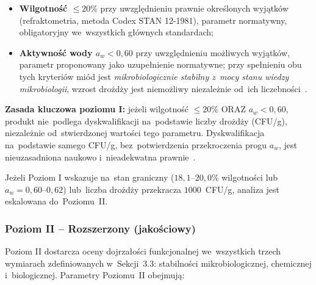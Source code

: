 \begin{itemize}
    \item \textbf{Wilgotność $\leq 20\%$} przy uwzględnieniu prawnie określonych wyjątków (refraktometria,
          metoda Codex STAN 12-1981), parametr normatywny,
          obligatoryjny we~wszystkich głównych standardach;
    \item \textbf{Aktywność wody $a_w < 0{,}60$} przy uwzględnieniu możliwych wyjątków, parametr
          proponowany jako uzupełnienie normatywne; przy spełnieniu
          obu tych kryteriów miód jest \emph{mikrobiologicznie
          stabilny z~mocy stanu wiedzy mikrobiologii}, wzrost drożdży
          jest niemożliwy niezależnie od~ich liczebności~\cite{ruegg1981,waaw2006}.
\end{itemize}

\textbf{Zasada kluczowa poziomu I:} jeżeli wilgotność $\leq 20\%$
\textsc{ORAZ} $a_w < 0{,}60$, produkt nie~podlega dyskwalifikacji
na~podstawie liczby drożdży (CFU/g), niezależnie od~stwierdzonej
wartości tego parametru. Dyskwalifikacja na~podstawie samego
CFU/g, bez~potwierdzenia przekroczenia progu $a_w$, jest
nieuzasadniona naukowo i~nieadekwatna prawnie~\cite{codex_stan12,eudir2001110}.

Jeżeli Poziom I wskazuje na~stan graniczny ($18{,}1$--$20{,}0\%$
wilgotności lub~$a_w = 0{,}60$--$0{,}62$) lub~liczba drożdży
przekracza $1000$~CFU/g, analiza jest eskalowana do~Poziomu~II.

\subsubsection{Poziom II – Rozszerzony (jakościowy)}

Poziom II dostarcza oceny dojrzałości funkcjonalnej
we~wszystkich trzech wymiarach zdefiniowanych w~Sekcji~3.3:
stabilności mikrobiologicznej, chemicznej i~biologicznej.
Parametry Poziomu~II obejmują:

